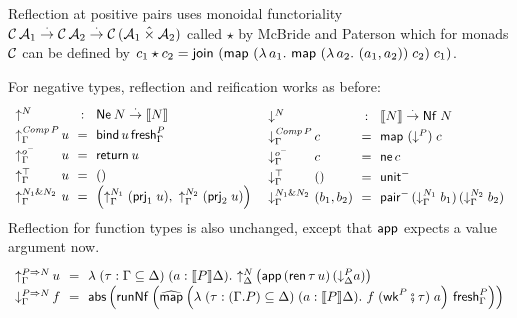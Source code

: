 \documentclass[sigplan,screen]{acmart}
\begin{document}
Reflection at positive pairs uses monoidal functoriality
$\mathcal{C}\,\mathcal{A}_1 \stackrel{\cdot}{\to} \mathcal{C}\,\mathcal{A}_2 \stackrel{\cdot}{\to} \mathcal{C}\,(\mathcal{A}_1 \mathbin{\hat\times} \mathcal{A}_2)$
called $\star$ by McBride and Paterson \cite[Section 7]{mcbridePaterson:applicative}
which for monads $\mathcal{C}$ can be defined by
$c_1 \star c_2 =
   \mathsf{join}^{} \; (\mathsf{map}^{}\;(\lambda\,a_1.\
   \mathsf{map}^{}\;(\lambda\,a_2.\ (a_1,a_2))
    \;c_2)
    \;c_1)$.

For negative types, reflection and reification works as before:
\[
\def\arraystretch{1.3}
\begin{array}{l@{\,}l@{~~}c@{~~}l}
  \multicolumn 2 l {\up N} & : & \tNe\,N \todot \den N \\
  \upG {\Comp P} & u & = & \tbind\,u\,\tfresh^P_\Gamma \\
  \upG \natom    & u & = & \treturn\,u \\
  \upG \top      & u & = & \ttempty \\
  \upG {N_1 \ntimes N_2} & u & = & \left(
    \upG {N_1} \; (\prj 1 u)
    ,\
    \upG {N_2} \; (\prj 2 u)
    \right) \\
\end{array}
\
\begin{array}{l@{\,}l@{~~}c@{~~}l}
  \multicolumn 2 l {\down N} & : & \den N \todot \tNf\;N \\
  \downG {\Comp P} & c  & = & \tmap\;(\down P)\;c \\
  \downG \natom    & c  & = & \tne\,c \\
  \downG \top      & () & = & \nunit \\
  \downG {N_1 \ntimes N_2} & (b_1,b_2) & = & \npair
    \, (\downG {N_1} \; b_1)
    \, (\downG {N_2} \; b_2)
    \\
\end{array}
\]
Reflection for function types is also unchanged, except that $\mathsf{app}$
expects a value argument now.
\[
\def\arraystretch{1.3}
\begin{array}{l@{\,}l@{~~}c@{~~}l}
  \upG {P \To N} & u & = & \lambda
    \;(\tau : \Gamma \sublist \Delta)
    \;(a : \den P \Delta)
    . \
    \up[\Delta] N \left( \tapp\,(\tren\,\tau\,u)\,(\down[\Delta] P a) \right)
    \\
  \downG {P \To N} & f & = & \tabs \left( \trunNf \left(
    \stmap
      \left(
        \lambda
          \;(\tau : (\cext \Gamma P) \sublist \Delta)
          \;(a : \den P \Delta)
          . \
          f\; (\twk^P \rcomp \tau)\; a
        \right)
      \,\tfresh^P_\Gamma
    \right) \right)
    \\
\end{array}
\]
\end{document}
